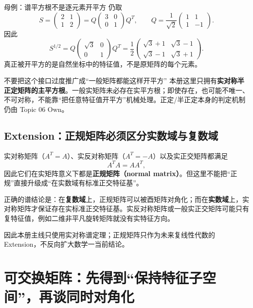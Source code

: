 \documentclass[11pt,a4paper]{ctexart}
\newcommand{\kw}[1]{\textbf{\color{deep}#1}}
\begin{document}
\begin{examplebox}{母例：谱平方根不是逐元素开平方}
仍取
\[
S=\begin{pmatrix}2&1\\1&2\end{pmatrix}
=Q\begin{pmatrix}3&0\\0&1\end{pmatrix}Q^T,
\qquad
Q=\frac1{\sqrt2}\begin{pmatrix}1&1\\1&-1\end{pmatrix}.
\]
因此
\[
S^{1/2}
=Q\begin{pmatrix}\sqrt3&0\\0&1\end{pmatrix}Q^T
=\frac12
\begin{pmatrix}
\sqrt3+1&\sqrt3-1\\
\sqrt3-1&\sqrt3+1
\end{pmatrix}.
\]
真正被开平方的是自然坐标中的特征值，不是原矩阵的每个元素。
\end{examplebox}

\begin{warnbox}{不要把这个接口过度推广成“一般矩阵都能这样开平方”}
本册这里只拥有\kw{实对称半正定矩阵的主平方根}。一般实矩阵未必存在实平方根；即使存在，也可能不唯一、不可对称，不能靠“把任意特征值开平方”机械处理。正定/半正定本身的判定机制仍由 Topic 06 Own。
\end{warnbox}

\subsection{Extension：正规矩阵必须区分实数域与复数域}
实对称矩阵（$A^T=A$）、实反对称矩阵（$A^T=-A$）以及实正交矩阵都满足
\[
A^TA=AA^T,
\]
因此它们在实矩阵意义下都是\kw{正规矩阵（normal matrix）}。但这里不能把“正规”直接升级成“在实数域有标准正交特征基”。

正确的谱结论是：在\kw{复数域}上，正规矩阵可以被酉矩阵对角化；而在\kw{实数域}上，实对称矩阵才保证存在实标准正交特征基。实反对称矩阵或一般实正交矩阵可能只有复特征值，例如二维非平凡旋转矩阵就没有实特征方向。

因此本册主线只使用实对称谱定理；正规矩阵只作为未来复线性代数的 Extension，不反向扩大数学一当前结论。

\section{可交换矩阵：先得到“保持特征子空间”，再谈同时对角化}
\end{document}
